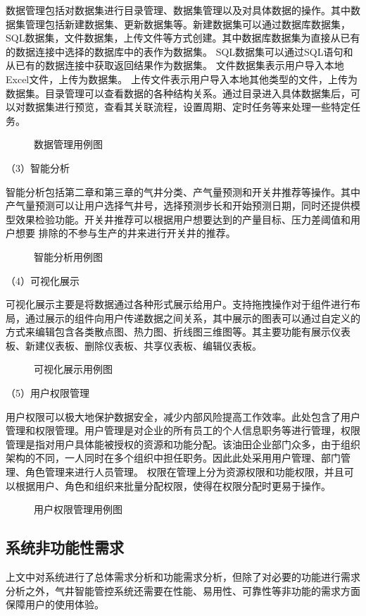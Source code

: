 数据管理包括对数据集进行目录管理、数据集管理以及对具体数据的操作。其中数据集管理包括新建数据集、更新数据集等。新建数据集可以通过数据库数据集，SQL数据集，文件数据集，上传文件等方式创建。其中数据库数据集为直接从已有的数据连接中选择的数据库中的表作为数据集。
SQL数据集可以通过SQL语句和从已有的数据连接中获取返回结果作为数据集。
文件数据集表示用户导入本地Excel文件，上传为数据集。
上传文件表示用户导入本地其他类型的文件，上传为数据集。目录管理可以查看数据的各种结构关系。通过目录进入具体数据集后，可以对数据集进行预览，查看其关联流程，设置周期、定时任务等来处理一些特定任务。
\begin{figure}[H]
    \centering
    \caption{数据管理用例图}
\end{figure}

（3）智能分析

智能分析包括第二章和第三章的气井分类、产气量预测和开关井推荐等操作。其中产气量预测可以让用户选择气井号，选择预测步长和开始预测日期，同时还提供模型效果检验功能。开关井推荐可以根据用户想要达到的产量目标、压力差阈值和用户想要
排除的不参与生产的井来进行开关井的推荐。
\begin{figure}[H]
    \centering
    \caption{智能分析用例图}
\end{figure}

（4）可视化展示

可视化展示主要是将数据通过各种形式展示给用户。支持拖拽操作对于组件进行布局，通过展示的组件向用户传递数据之间关系，其中展示的图表可以通过自定义的方式来编辑包含各类散点图、热力图、折线图三维图等。其主要功能有展示仪表板、新建仪表板、删除仪表板、共享仪表板、编辑仪表板。
\begin{figure}[H]
    \centering
    \caption{可视化展示用例图}
\end{figure}

（5）用户权限管理

用户权限可以极大地保护数据安全，减少内部风险提高工作效率。此处包含了用户管理和权限管理。用户管理是对企业的所有员工的个人信息职务等进行管理，权限管理是指对用户具体能被授权的资源和功能分配。该油田企业部门众多，由于组织架构的不同，一人同时在多个组织中担任职务。因此此处采用用户管理、部门管理、角色管理来进行人员管理。
权限在管理上分为资源权限和功能权限，并且可以根据用户、角色和组织来批量分配权限，使得在权限分配时更易于操作。
\begin{figure}[H]
    \centering
    \caption{用户权限管理用例图}
\end{figure}
\subsection{系统非功能性需求}
上文中对系统进行了总体需求分析和功能需求分析，但除了对必要的功能进行需求分析之外，气井智能管控系统还需要在性能、易用性、可靠性等非功能的需求方面保障用户的使用体验。

